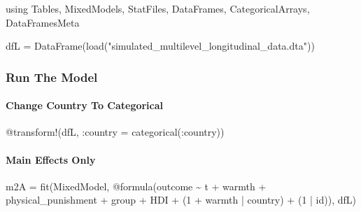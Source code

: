 \documentclass[
  letterpaper,
  DIV=11,
  numbers=noendperiod]{scrreprt}
\let\oldparagraph\paragraph
\renewcommand{\paragraph}[1]{\oldparagraph{#1}\mbox{}}
\newenvironment{Shaded}{\begin{snugshade}}{\end{snugshade}}
\newcommand{\BuiltInTok}[1]{\textcolor[rgb]{0.00,0.23,0.31}{#1}}
\newcommand{\FloatTok}[1]{\textcolor[rgb]{0.68,0.00,0.00}{#1}}
\newcommand{\FunctionTok}[1]{\textcolor[rgb]{0.28,0.35,0.67}{#1}}
\newcommand{\ImportTok}[1]{\textcolor[rgb]{0.00,0.46,0.62}{#1}}
\newcommand{\NormalTok}[1]{\textcolor[rgb]{0.00,0.23,0.31}{#1}}
\newcommand{\OperatorTok}[1]{\textcolor[rgb]{0.37,0.37,0.37}{#1}}
\newcommand{\PreprocessorTok}[1]{\textcolor[rgb]{0.68,0.00,0.00}{#1}}
\newcommand{\StringTok}[1]{\textcolor[rgb]{0.13,0.47,0.30}{#1}}
\begin{document}
\begin{Shaded}
\begin{Highlighting}[]
\ImportTok{using} \BuiltInTok{Tables}\NormalTok{, }\BuiltInTok{MixedModels}\NormalTok{, }\BuiltInTok{StatFiles}\NormalTok{, }\BuiltInTok{DataFrames}\NormalTok{, }\BuiltInTok{CategoricalArrays}\NormalTok{, }\BuiltInTok{DataFramesMeta}

\NormalTok{dfL }\OperatorTok{=} \FunctionTok{DataFrame}\NormalTok{(}\FunctionTok{load}\NormalTok{(}\StringTok{"simulated\_multilevel\_longitudinal\_data.dta"}\NormalTok{))}
\end{Highlighting}
\end{Shaded}

\subsubsection{Run The Model}\label{run-the-model-5}

\paragraph{Change Country To
Categorical}\label{change-country-to-categorical-1}

\begin{Shaded}
\begin{Highlighting}[]
\PreprocessorTok{@transform}\NormalTok{!(dfL, }\OperatorTok{:}\NormalTok{country }\OperatorTok{=} \FunctionTok{categorical}\NormalTok{(}\OperatorTok{:}\NormalTok{country))}
\end{Highlighting}
\end{Shaded}

\paragraph{Main Effects Only}\label{main-effects-only-2}

\begin{Shaded}
\begin{Highlighting}[]

\NormalTok{m2A }\OperatorTok{=} \FunctionTok{fit}\NormalTok{(MixedModel, }\PreprocessorTok{@formula}\NormalTok{(outcome }\OperatorTok{\textasciitilde{}}\NormalTok{ t }\OperatorTok{+}\NormalTok{ warmth }\OperatorTok{+} 
\NormalTok{                                 physical\_punishment }\OperatorTok{+} 
\NormalTok{                                 group }\OperatorTok{+}\NormalTok{ HDI }\OperatorTok{+}
\NormalTok{                                 (}\FloatTok{1} \OperatorTok{+}\NormalTok{ warmth }\OperatorTok{|}\NormalTok{ country) }\OperatorTok{+}
\NormalTok{                                 (}\FloatTok{1} \OperatorTok{|}\NormalTok{ id)), dfL)}
\end{Highlighting}
\end{Shaded}
\end{document}
